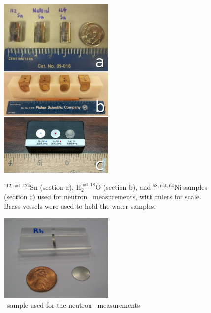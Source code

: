 \begin{figure}[h]
    \centering
    \includegraphics[width=0.5\textwidth]{figures/AllIsotopicSamples.jpg}
    \caption[${^{112,\text{nat},124}}$Sn, $^{{\text{nat}, 18}}$O, and ${^{58,\text{nat},64}}$Ni
samples used for neutron \tot\ measurements]
{
    ${^{112,\text{nat},124}}$Sn (section a), H$_2^{{\text{nat}, 18}}$O (section
    b), and ${^{58,\text{nat},64}}$Ni
    samples (section c) used for neutron \tot\ measurements, with rulers for
    scale. Brass vessels were used to hold the water samples.
}
    \label{SamplesImage}

    \vspace*{\floatsep}

    \includegraphics[width=0.5\textwidth]{figures/RhodiumSample.jpg}
    \caption{\rhThree\ sample used for the neutron \tot\ measurements}
    \label{RhodiumSample}
\end{figure}

